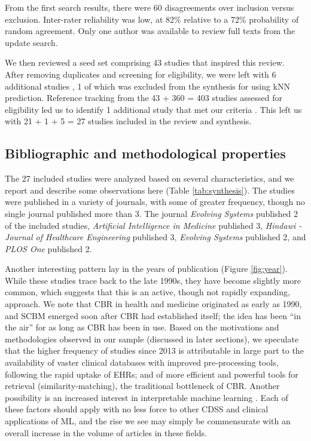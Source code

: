 \documentclass[sn-mathphys,Numbered,pdflatex]{sn-jnl}
\theoremstyle{remark}
\theoremstyle{definition}
\newcommand{\hl}[1]{#1}
\begin{document}
From the first search results, there were 60 disagreements over
inclusion versus exclusion. Inter-rater reliability was low, at 82\%
relative to a 72\% probability of random agreement. Only one author was
available to review full texts from the update search.

We then reviewed \hl{a seed set comprising 43 studies} that inspired
this review. After removing duplicates and screening for eligibility, we
were left with 6 additional studies
\citep{Park2006, Lowsky2013, Lee2015, Ng2015, Lee2017, Wang2019}, 1 of
which was excluded from the synthesis for using \hl{kNN} prediction.
Reference tracking from the 43 + 360 = 403 studies assessed for
eligibility led us to identify 1 additional study that met our criteria
\citep{Kasabov2010}. This left us with 21 + 1 + 5 = 27 studies included
in the review and synthesis.

\subsection{Bibliographic and methodological
properties}\label{bibliographic-and-methodological-properties}

The 27 included studies were analyzed based on several characteristics,
and we report and describe some observations here (Table
\ref{tab:synthesis}). The studies were published in a variety of
journals, with some of greater frequency, though no single journal
published more than 3. The journal \emph{Evolving Systems} published 2
of the included studies, \emph{Artificial Intelligence in Medicine}
published 3, \emph{Hindawi - Journal of Healthcare Engineering}
published 3, \emph{Evolving Systems} published 2, and \emph{PLOS One}
published 2.

Another interesting pattern lay in the years of publication (Figure
\ref{fig:year}). While these studies trace back to the late 1990s, they
have become \hl{slightly }more common, which suggests that this is an
active, though not rapidly expanding, approach. We note that CBR in
health and medicine originated as early as 1990, and \hl{SCBM} emerged
soon after CBR had established itself; the idea has been ``in the air''
for as long as CBR has been in use.
\hl{ Based on the motivations and methodologies observed in our sample (discussed in later sections), we speculate that the higher frequency of studies since 2013 is attributable in large part to the availability of vaster clinical databases with improved pre-processing tools, following the rapid uptake of EHRs; and of more efficient and powerful tools for retrieval (similarity-matching), the traditional bottleneck of CBR. Another possibility is an increased interest in interpretable machine learning }\citep{Rudin2022}\hl{. Each of these factors should apply with no less force to other CDSS and clinical applications of ML, and the rise we see may simply be commensurate with an overall increase in the volume of articles in these fields.}
\end{document}
